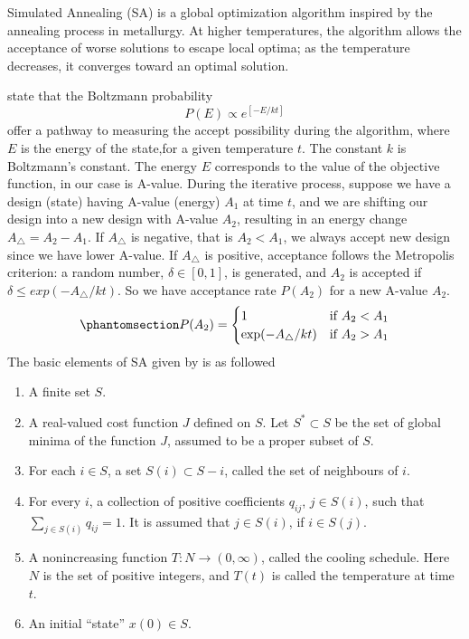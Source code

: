 \documentclass[
  a4paper,
  oneside,
  openany,
  12pt,
  onecolumn]{book}
\providecommand{\tightlist}{%
  \setlength{\itemsep}{0pt}\setlength{\parskip}{0pt}}\usepackage{longtable,booktabs,array}
\theoremstyle{definition}
\theoremstyle{definition}
\theoremstyle{plain}
\theoremstyle{remark}
\begin{document}
Simulated Annealing (SA) is a global optimization algorithm inspired by
the annealing process in metallurgy. At higher temperatures, the
algorithm allows the acceptance of worse solutions to escape local
optima; as the temperature decreases, it converges toward an optimal
solution.

\citet{butler2013optimal} state that the Boltzmann probability \[
P(E)\propto e^{[-E/kt]}
\] offer a pathway to measuring the accept possibility during the
algorithm, where \(E\) is the energy of the state,for a given
temperature \(t\). The constant \(k\) is Boltzmann's constant. The
energy \(E\) corresponds to the value of the objective function, in our
case is A-value. During the iterative process, suppose we have a design
(state) having A-value (energy) \(A_1\) at time \(t\), and we are
shifting our design into a new design with A-value \(A_2\), resulting in
an energy change \(A_{\bigtriangleup} = A_2 - A_1\). If
\(A_{\bigtriangleup}\) is negative, that is \(A_2 < A_1\), we always
accept new design since we have lower A-value. If \(A_{\bigtriangleup}\)
is positive, acceptance follows the Metropolis criterion: a random
number, \(\delta \in [0,1]\), is generated, and \(A_2\) is accepted if
\(\delta \leq exp(-A_{\bigtriangleup}/kt)\). So we have acceptance rate
\(P(A_2)\) for a new A-value \(A_2\).
\begin{equation}\phantomsection\label{eq-prob}{
P(A_2)=
\begin{cases}
1 & \text{if } A_2<A_1 \\
\exp(-A_{\bigtriangleup}/kt) & \text{if } A_2>A_1\\
\end{cases}
}\end{equation} The basic elements of SA given by
\citet{bertsimas1993simulated} is as followed

\begin{enumerate}
\def\labelenumi{\arabic{enumi}.}
\tightlist
\item
  A finite set \(S\).
\item
  A real-valued cost function \(J\) defined on \(S\). Let
  \(S^*\subset S\) be the set of global minima of the function \(J\),
  assumed to be a proper subset of \(S\).
\item
  For each \(i\in S\), a set \(S(i) \subset S - {i}\), called the set of
  neighbours of \(i\).
\item
  For every \(i\), a collection of positive coefficients \(q_{ij}\),
  \(j\in S(i)\), such that \(\sum_{j\in S(i)} q_{ij} = 1\). It is
  assumed that \(j\in S(i)\), if \(i \in S(j)\).
\item
  A nonincreasing function \(T:N\rightarrow (0, \infty)\), called the
  cooling schedule. Here \(N\) is the set of positive integers, and
  \(T(t)\) is called the temperature at time \(t\).
\item
  An initial ``state'' \(x(0)\in S\).
\end{enumerate}
\end{document}
